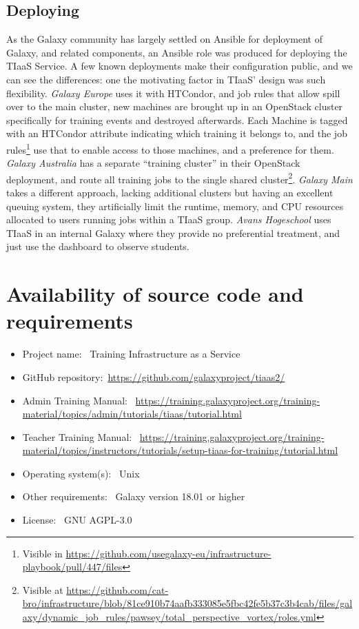 \documentclass[a4paper,num-refs]{oup-contemporary}
\begin{document}
\subsection{Deploying}
As the Galaxy community has largely settled on Ansible for deployment of Galaxy, and related components, an Ansible role was produced for deploying the TIaaS Service. A few known deployments make their configuration public, and we can see the differences: one the motivating factor in TIaaS' design was such flexibility. \emph{Galaxy Europe} uses it with HTCondor, and job rules that allow spill over to the main cluster, new machines are brought up in an OpenStack cluster specifically for training events and destroyed afterwards. Each Machine is tagged with an HTCondor attribute indicating which training it belongs to, and the job rules\footnote{Visible in \url{https://github.com/usegalaxy-eu/infrastructure-playbook/pull/447/files}} use that to enable access to those machines, and a preference for them. \emph{Galaxy Australia} has a separate ``training cluster'' in their OpenStack deployment, and route all training jobs to the single shared cluster\footnote{Visible at \url{https://github.com/cat-bro/infrastructure/blob/81ce910b74aafb333085e5fbc42fe5b37c3b4cab/files/galaxy/dynamic_job_rules/pawsey/total_perspective_vortex/roles.yml}}. \emph{Galaxy Main} takes a different approach, lacking additional clusters but having an excellent queuing system, they artificially limit the runtime, memory, and CPU resources allocated to users running jobs within a TIaaS group. \emph{Avans Hogeschool} uses TIaaS in an internal Galaxy where they provide no preferential treatment, and just use the dashboard to observe students.

\section{Availability of source code and requirements}

\begin{itemize}
\item Project name: ~Training Infrastructure as a Service
\item GitHub repository:~\url{https://github.com/galaxyproject/tiaas2/}
\item Admin Training Manual: ~\url{https://training.galaxyproject.org/training-material/topics/admin/tutorials/tiaas/tutorial.html}
\item Teacher Training Manual: ~\url{https://training.galaxyproject.org/training-material/topics/instructors/tutorials/setup-tiaas-for-training/tutorial.html}
\item Operating system(s): ~Unix
\item Other requirements: ~Galaxy version 18.01 or higher
\item License: ~GNU AGPL-3.0
\end{itemize}
\end{document}
